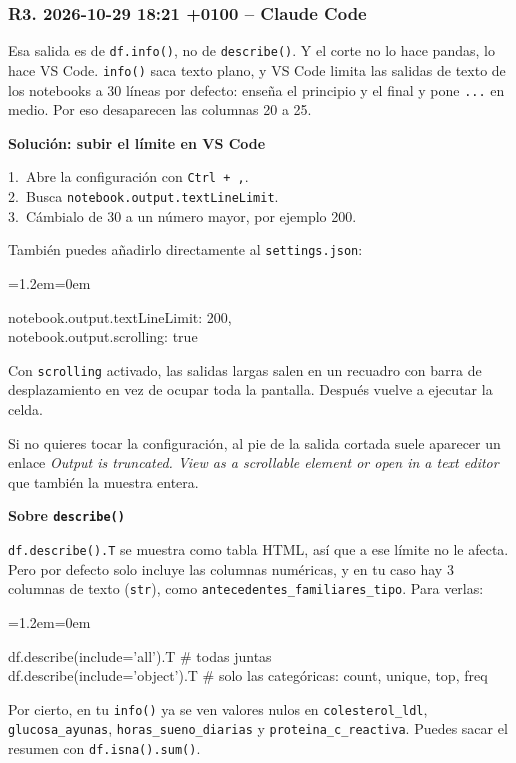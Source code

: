 \documentclass[11pt,a4paper]{article}
\newenvironment{codigo}
  {\par\smallskip\begin{list}{}{\leftmargin=1.2em\rightmargin=0em}\item\relax\ttfamily\scriptsize\raggedright}
  {\end{list}\smallskip}
\begin{document}
\subsubsection*{R3. 2026-10-29 18:21 +0100 -- Claude Code}
{\small
Esa salida es de \texttt{df.info()}, no de \texttt{describe()}. Y el corte no lo hace pandas, lo hace VS Code. \texttt{info()} saca texto plano, y VS Code limita las salidas de texto de los notebooks a 30 líneas por defecto: enseña el principio y el final y pone \texttt{...} en medio. Por eso desaparecen las columnas 20 a 25.

\textbf{Solución: subir el límite en VS Code}

\hspace*{1.0em}1.~Abre la configuración con \texttt{Ctrl + ,}. \\{}
\hspace*{1.0em}2.~Busca \texttt{notebook.output.textLineLimit}. \\{}
\hspace*{1.0em}3.~Cámbialo de 30 a un número mayor, por ejemplo 200.

También puedes añadirlo directamente al \texttt{settings.json}:

\begin{codigo}
\textquotedbl{}notebook.output.textLineLimit\textquotedbl{}: 200, \\{}
\textquotedbl{}notebook.output.scrolling\textquotedbl{}: true
\end{codigo}
Con \texttt{scrolling} activado, las salidas largas salen en un recuadro con barra de desplazamiento en vez de ocupar toda la pantalla. Después vuelve a ejecutar la celda.

Si no quieres tocar la configuración, al pie de la salida cortada suele aparecer un enlace \textit{\textquotedbl{}Output is truncated. View as a scrollable element or open in a text editor\textquotedbl{}} que también la muestra entera.

\textbf{Sobre \texttt{describe()}}

\texttt{df.describe().T} se muestra como tabla HTML, así que a ese límite no le afecta. Pero por defecto solo incluye las columnas numéricas, y en tu caso hay 3 columnas de texto (\texttt{str}), como \texttt{antecedentes\_\allowbreak{}familiares\_\allowbreak{}tipo}. Para verlas:

\begin{codigo}
df.describe(include='all').T          \# todas juntas \\{}
df.describe(include='object').T       \# solo las categóricas: count, unique, top, freq
\end{codigo}
Por cierto, en tu \texttt{info()} ya se ven valores nulos en \texttt{colesterol\_\allowbreak{}ldl}, \texttt{glucosa\_\allowbreak{}ayunas}, \texttt{horas\_\allowbreak{}sueno\_\allowbreak{}diarias} y \texttt{proteina\_\allowbreak{}c\_\allowbreak{}reactiva}. Puedes sacar el resumen con \texttt{df.isna().sum()}.

}
\end{document}
